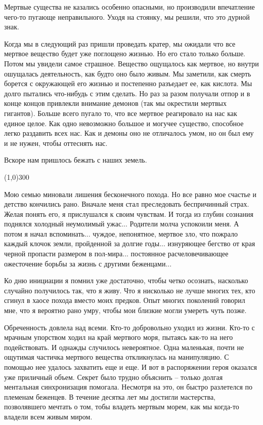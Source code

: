 \documentclass[12pt,a4paper]{article}
\newcommand{\sep}{
	\begin{center}
		\line(1,0){300}
	\end{center}
}
\begin{document}
Мертвые существа не казались особенно опасными, но производили впечатление чего-то пугающе неправильного. Уходя на стоянку, мы решили, что это дурной знак.

Когда мы в следующий раз пришли проведать кратер, мы ожидали что все мертвое вещество будет уже поглощено жизнью. Но его стало только больше. Потом мы увидели самое страшное. Вещество ощущалось как мертвое, но внутри ошущалась деятельность, как будто оно было живым. Мы заметили, как смерть борется с окружающей его жизнью и постепенно разъедает ее, как кислота. Мы долго пытались что-нибудь с этим сделать. Но раз за разом получали отпор и в конце концов привлекли внимание демонов (так мы окрестили мертвых гигантов). Больше всего пугало то, что все мертвое реагировало на нас как единое целое. Как одно невозможно большое и могучее существо, способное легко раздавить всех нас. Как и демоны оно не отличалось умом, но он был ему и не нужен, чтобы оттеснять нас.

Вскоре нам пришлось бежать с наших земель.

\sep

Мою семью миновали лишения бесконечного похода. Но все равно мое счастье и детство кончились рано. Вначале меня стал преследовать беспричинный страх. Желая понять его, я прислушался к своим чувствам. И тогда из глубин сознания поднялся холодный неумолимый ужас... Родители молча успокоили меня. А потом я начал вспоминать... чуждое, непонятное, мертвое зло, что пожрало каждый клочок земли, пройденной за долгие годы... изнуряющее бегство от края черной пропасти размером в пол-мира... постоянное расчеловечивающее ожесточение борьбы за жизнь с другими беженцами...

Ко дню инициации я помнил уже достаточно, чтобы четко осознать, насколько случайно получилось так, что я живу. Что я нисколько не лучше многих тех, кто сгинул в хаосе похода вместо моих предков. Опыт многих поколений говорил мне, что я вероятно рано умру, чтобы мои близкие могли умереть чуть позже.

Обреченность довлела над всеми. Кто-то добровольно уходил из жизни. Кто-то с мрачным упорством ходил на край мертвого моря, пытаясь как-то на него подействовать. И однажды случилось невероятное. Одна маленькая, почти не ощутимая частичка мертвого вещества откликнулась на манипуляцию. С помощью нее удалось захватить еще и еще. И вот в распоряжении героя оказался уже приличный объем. Секрет было трудно объяснить -- только долгая ментальная синхронизация помогала. Несмотря на это, он быстро разлетелся по племенам беженцев. В течение десятка лет мы достигли мастерства, позволявшего мечтать о том, тобы владеть мертвым морем, как мы когда-то владели всем живым миром.
\end{document}
